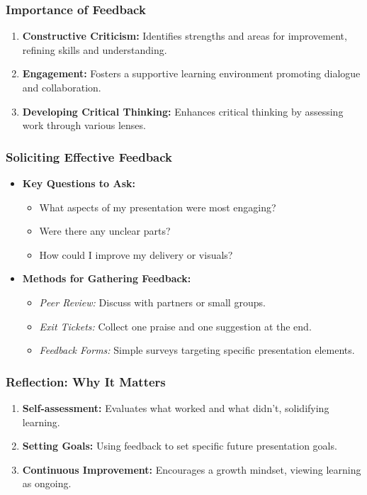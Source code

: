 \documentclass[aspectratio=169]{beamer}
\begin{document}
\begin{frame}[fragile]
    \frametitle{Importance of Feedback}
    \begin{enumerate}
        \item \textbf{Constructive Criticism:} Identifies strengths and areas for improvement, refining skills and understanding.
        \item \textbf{Engagement:} Fosters a supportive learning environment promoting dialogue and collaboration.
        \item \textbf{Developing Critical Thinking:} Enhances critical thinking by assessing work through various lenses.
    \end{enumerate}
\end{frame}

\begin{frame}[fragile]
    \frametitle{Soliciting Effective Feedback}
    \begin{itemize}
        \item \textbf{Key Questions to Ask:}
        \begin{itemize}
            \item What aspects of my presentation were most engaging?
            \item Were there any unclear parts?
            \item How could I improve my delivery or visuals?
        \end{itemize}
        \item \textbf{Methods for Gathering Feedback:}
        \begin{itemize}
            \item \textit{Peer Review:} Discuss with partners or small groups.
            \item \textit{Exit Tickets:} Collect one praise and one suggestion at the end.
            \item \textit{Feedback Forms:} Simple surveys targeting specific presentation elements.
        \end{itemize}
    \end{itemize}
\end{frame}

\begin{frame}[fragile]
    \frametitle{Reflection: Why It Matters}
    \begin{enumerate}
        \item \textbf{Self-assessment:} Evaluates what worked and what didn’t, solidifying learning.
        \item \textbf{Setting Goals:} Using feedback to set specific future presentation goals.
        \item \textbf{Continuous Improvement:} Encourages a growth mindset, viewing learning as ongoing.
    \end{enumerate}
\end{frame}
\end{document}
